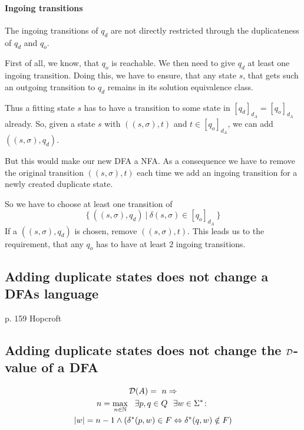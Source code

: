 \paragraph*{Ingoing transitions}

The ingoing transitions of $q_d$ are not directly restricted through the duplicateness of $q_d$ and $q_o$.

First of all, we know, that $q_o$ is reachable. We then need to give $q_d$ at least one ingoing transition. Doing this, we have to ensure, that any state $s$, that gets such an outgoing transition to $q_d$ remains in its solution equivalence class.
	
Thus a fitting state $s$ has to have a transition to some state in $[q_d]_{d_A} = [q_o]_{d_A}$ already. So, given a state $s$ with $((s, \sigma), t)$ and $t \in [q_o]_{d_A}$, we can add $((s, \sigma), q_d)$.

But this would make our new DFA a NFA. As a consequence we have to remove the original transition $((s, \sigma), t)$ each time we add an ingoing transition for a newly created duplicate state.

So we have to choose at least one transition of
\[
	\{\ ((s, \sigma), q_d)\ |\ \delta(s,\sigma) \in [q_o]_{d_A}\ \}
\]
If a $((s, \sigma), q_d)$ is chosen, remove $((s, \sigma), t)$. This leads us to the requirement, that any $q_o$ has to have at least $2$ ingoing transitions.

\subsection{Adding duplicate states does not change a DFAs language}

p. 159 Hopcroft

\subsection{Adding duplicate states does not change the $\mathcal{D}$-value of a DFA}

\begin{lemma}
	\begin{multline*}
	\mathcal{D}(A) =\ n \Rightarrow \\
	n = \max_{n \in \mathbb{N}}\ \ \exists p, q \in Q\ \ \exists w \in \Sigma^* \colon \\
	|w| = n - 1 \land (\delta^*(p,w) \in F \Leftrightarrow \delta^*(q,w) \notin F)
	\end{multline*}
\end{lemma}

